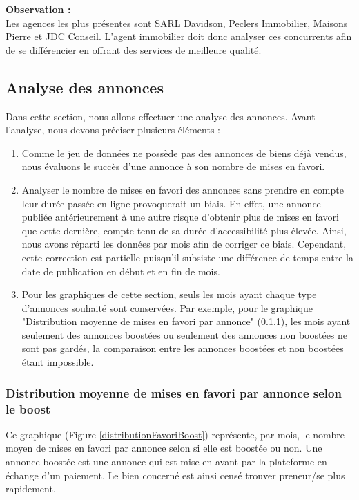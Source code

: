 \documentclass[a4paper, 12pt, twoside]{report}
\begin{document}
			{\bf Observation :} \\

			Les agences les plus présentes sont SARL Davidson, Peclers Immobilier, Maisons Pierre et JDC Conseil. L'agent immobilier doit donc analyser ces concurrents afin de se différencier en offrant des services de meilleure qualité. \\

		\subsection{Analyse des annonces}

		Dans cette section, nous allons effectuer une analyse des annonces. Avant l'analyse, nous devons préciser plusieurs éléments :
		\begin{enumerate}
				\item Comme le jeu de données ne possède pas des annonces de biens déjà vendus, nous évaluons le succès d'une annonce à son nombre de mises en favori.
				\item Analyser le nombre de mises en favori des annonces sans prendre en compte leur durée passée en ligne provoquerait un biais. En effet, une annonce publiée antérieurement à une autre risque d'obtenir plus de mises en favori que cette dernière, compte tenu de sa durée d'accessibilité plus élevée. Ainsi, nous avons réparti les données par mois afin de corriger ce biais. Cependant, cette correction est partielle puisqu'il subsiste une différence de temps entre la date de publication en début et en fin de mois.
				\item Pour les graphiques de cette section, seuls les mois ayant chaque type d'annonces souhaité sont conservées. Par exemple, pour le graphique "Distribution moyenne de mises en favori par annonce" (\ref{secDistributionFavoriBoost}), les mois ayant seulement des annonces boostées ou seulement des annonces non boostées ne sont pas gardés, la comparaison entre les annonces boostées et non boostées étant impossible.
		\end{enumerate}

			\subsubsection{Distribution moyenne de mises en favori par annonce selon le boost}
			\label{secDistributionFavoriBoost}

			Ce graphique (Figure \ref{distributionFavoriBoost}) représente, par mois, le nombre moyen de mises en favori par annonce selon si elle est boostée ou non. Une annonce boostée est une annonce qui est mise en avant par la plateforme en échange d'un paiement. Le bien concerné est ainsi censé trouver preneur/se plus rapidement. \\
\end{document}
